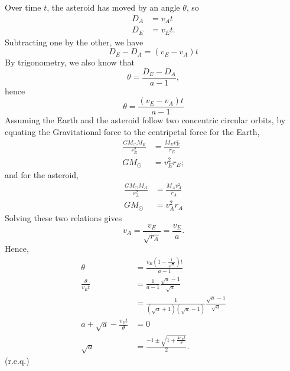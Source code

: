 Over time $t$, the asteroid has moved by an angle $\theta$, so
\begin{align*}
D_{A} &= v_{A}t \\
D_{E} &= v_{E}t.
\end{align*}
Subtracting one by the other, we have
\begin{equation*}
D_{E}-D_{A}=(v_{E}-v_{A})t
\end{equation*}
By trigonometry, we also know that
\begin{equation*}
\theta = \frac{D_{E}-D_{A}}{a-1},
\end{equation*}
hence
\begin{equation*}
\theta = \frac{(v_{E}-v_{A})t}{a-1}
\end{equation*}
Assuming the Earth and the asteroid follow two concentric circular orbits, by equating the Gravitational force to the centripetal force for the Earth,
\begin{align*}
\frac{GM_{\odot}M_{E}}{r_{E}^{2}} &= \frac{M_{E}v_{E}^{2}}{r_{E}} \\
GM_{\odot} &= v_{E}^{2}r_{E};
\end{align*}
and for the asteroid,
\begin{align*}
\frac{GM_{\odot}M_{A}}{r_{A}^{2}} &= \frac{M_{A}v_{A}^{2}}{r_{A}} \\
GM_{\odot} &= v_{A}^{2}r_{A}
\end{align*}
Solving these two relations gives
\begin{equation*}
v_{A} = \frac{v_{E}}{\sqrt{r_{A}}} = \frac{v_{E}}{a}.
\end{equation*}
Hence,
\begin{align*}
\theta &= \frac{v_{E}(1-\frac{1}{\sqrt{a}})t}{a-1} \\
\frac{\theta}{v_{E}t} &= \frac{1}{a-1} \frac{\sqrt{a}-1}{\sqrt{a}} \\
&= \frac{1}{(\sqrt{a}+1)(\sqrt{a}-1)} \frac{\sqrt{a}-1}{\sqrt{a}} \\
a + \sqrt{a} - \frac{v_{E}t}{\theta} &= 0 \\
\sqrt{a} &= \frac{-1\pm \sqrt{1+\frac{4v_{E}t}{\theta}}}{2}.
\end{align*}
(r.e.q.)

\begin{center}
\centerline{}
\end{center}


